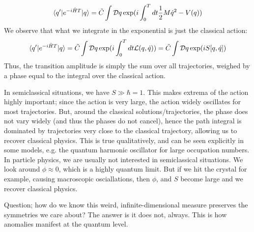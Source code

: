 \begin{equation}
    \langle q' \rvert e^{-i\hat{H}T}\lvert q \rangle = \tilde{C}\int \mathcal{D}q\exp(i\int_0^T dt\frac{1}{2}M\dot{q}^2 - V(q))
\end{equation}
We observe that what we integrate in the exponential is just the classical action:
\begin{equation}
    \langle q' \rvert e^{-i\hat{H}T}\lvert q \rangle = \tilde{C}\int \mathcal{D}q\exp(i\int_0^T dt \mathcal{L}(q, \dot{q})) = \tilde{C}\int \mathcal{D}q \exp(iS[q, \dot{q}])
\end{equation}
Thus, the transition amplitude is simply the sum over all trajectories, weighed by a phase equal to the integral over the classical action.

In semiclassical situations, we have $S \gg \hbar = 1$. This makes extrema of the action highly important; since the action is very large, the action widely oscillates for most trajectories. But, around the classical solutions/trajectories, the phase does not vary widely (and thus the phases do not cancel), hence the path integral is dominated by trajectories very close to the classical trajectory, allowing us to recover classical physics. This is true qualitatively, and can be seen explicitly in some models, e.g. the quantum harmonic oscillator for large occupation numbers. In particle physics, we are usually not interested in semiclassical situations. We look around $\phi \approx 0$, which is a highly quantum limit. But if we hit the crystal for example, causing macroscopic osciallations, then $\phi$, and $S$ become large and we recover classical physics.

Question; how do we know this weird, infinite-dimensional measure preserves the symmetries we care about? The answer is it does not, always. This is how anomalies manifest at the quantum level.

